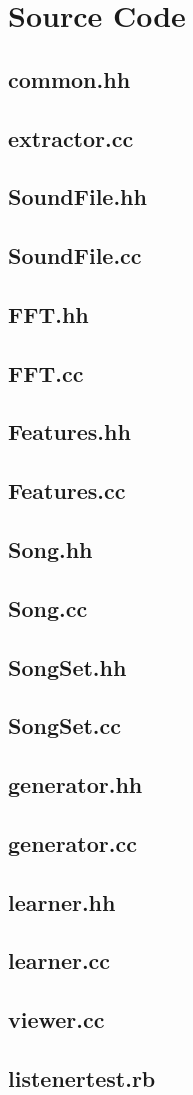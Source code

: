 \pagebreak
\marginsize{1cm}{1cm}{1cm}{2cm}
\chapter{Source Code}

\newcommand{\inputcode}[1]{
\section{#1}
\label{code:#1}
\small

}

\inputcode{common.hh}
\inputcode{extractor.cc}
\inputcode{SoundFile.hh}
\inputcode{SoundFile.cc}
\inputcode{FFT.hh}
\inputcode{FFT.cc}
\inputcode{Features.hh}
\inputcode{Features.cc}
\inputcode{Song.hh}
\inputcode{Song.cc}
\inputcode{SongSet.hh}
\inputcode{SongSet.cc}
\inputcode{generator.hh}
\inputcode{generator.cc}
\inputcode{learner.hh}
\inputcode{learner.cc}
\inputcode{viewer.cc}
\inputcode{listenertest.rb}
